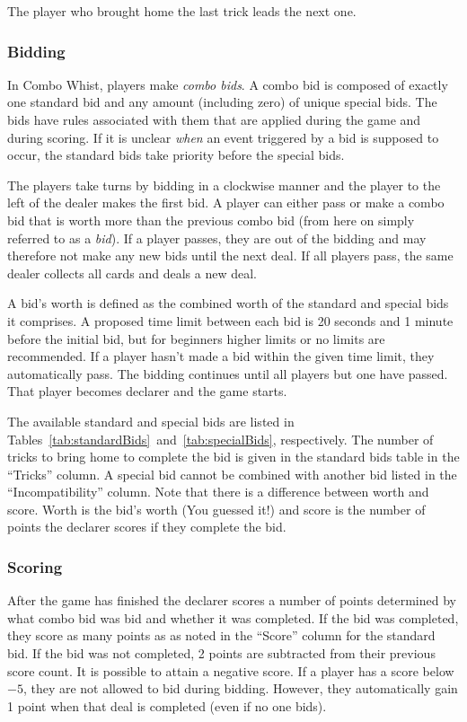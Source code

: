 \documentclass[a4paper]{article}
\begin{document}
{{{				 The player who brought home the last trick leads the next one.
			}

			\subsubsection{Bidding}{\label{sec:bidding}
				In Combo Whist, players make \emph{combo bids}. A combo bid is composed of exactly one standard bid and any amount (including zero) of unique special bids. The bids have rules associated with them that are applied during the game and during scoring. If it is unclear \emph{when} an event triggered by a bid is supposed to occur, the standard bids take priority before the special bids.

				The players take turns by bidding in a clockwise manner and the player to the left of the dealer makes the first bid. A player can either pass or make a combo bid that is worth more than the previous combo bid (from here on simply referred to as a \emph{bid}). If a player passes, they are out of the bidding and may therefore not make any new bids until the next deal. If all players pass, the same dealer collects all cards and deals a new deal.

				A bid's worth is defined as the combined worth of the standard and special bids it comprises. A proposed time limit between each bid is 20 seconds and 1 minute before the initial bid, but for beginners higher limits or no limits are recommended. If a player hasn't made a bid within the given time limit, they automatically pass. The bidding continues until all players but one have passed. That player becomes declarer and the game starts.

				The available standard and special bids are listed in Tables~\ref{tab:standardBids}~and~\ref{tab:specialBids}, respectively. The number of tricks to bring home to complete the bid is given in the standard bids table in the ``Tricks'' column. A special bid cannot be combined with another bid listed in the ``Incompatibility'' column. Note that there is a difference between worth and score. Worth is the bid's worth (You guessed it!) and score is the number of points the declarer scores if they complete the bid.
			}

			\subsubsection{Scoring}{%
				After the game has finished the declarer scores a number of points determined by what combo bid was bid and whether it was completed. If the bid was completed, they score as many points as as noted in the ``Score'' column for the standard bid. If the bid was not completed, 2 points are subtracted from their previous score count. It is possible to attain a negative score. If a player has a score below $-5$, they are not allowed to bid during bidding. However, they automatically gain 1 point when that deal is completed (even if no one bids).
			}

}}
\end{document}

